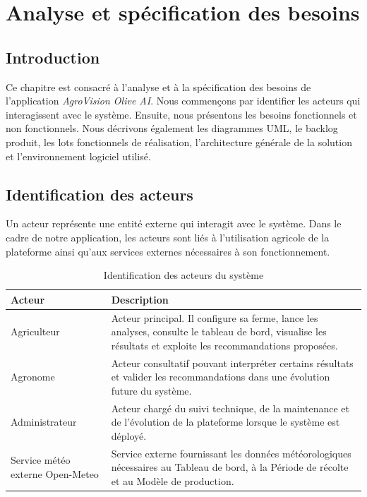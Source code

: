 \documentclass[12pt,a4paper]{report}
\begin{document}
\chapter{Analyse et spécification des besoins}

\section{Introduction}

Ce chapitre est consacré à l'analyse et à la spécification des besoins de l'application \textit{AgroVision Olive AI}. Nous commençons par identifier les acteurs qui interagissent avec le système. Ensuite, nous présentons les besoins fonctionnels et non fonctionnels. Nous décrivons également les diagrammes UML, le backlog produit, les lots fonctionnels de réalisation, l'architecture générale de la solution et l'environnement logiciel utilisé.

\section{Identification des acteurs}

Un acteur représente une entité externe qui interagit avec le système. Dans le cadre de notre application, les acteurs sont liés à l'utilisation agricole de la plateforme ainsi qu'aux services externes nécessaires à son fonctionnement.

\begin{table}[H]
\centering
\caption{Identification des acteurs du système}
\label{tab:acteurs-systeme}
\begin{tabular}{|>{\raggedright\arraybackslash}p{4cm}|>{\raggedright\arraybackslash}p{10cm}|}
\hline
\textbf{Acteur} & \textbf{Description} \\
\hline
Agriculteur & Acteur principal. Il configure sa ferme, lance les analyses, consulte le tableau de bord, visualise les résultats et exploite les recommandations proposées. \\
\hline
Agronome & Acteur consultatif pouvant interpréter certains résultats et valider les recommandations dans une évolution future du système. \\
\hline
Administrateur & Acteur chargé du suivi technique, de la maintenance et de l'évolution de la plateforme lorsque le système est déployé. \\
\hline
Service météo externe Open-Meteo & Service externe fournissant les données météorologiques nécessaires au Tableau de bord, à la Période de récolte et au Modèle de production. \\
\hline
\end{tabular}
\end{table}
\end{document}
